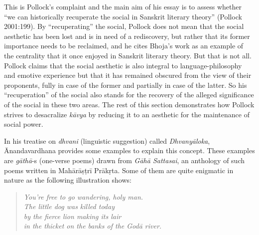 This is Pollock's complaint and the main aim of his essay is to assess whether ``we can historically recuperate the social in Sanskrit literary theory'' (Pollock 2001:199). By ``recuperating'' the social, Pollock does not mean that the social aesthetic has been lost and is in need of a rediscovery, but rather that its former importance needs to be reclaimed, and he cites Bhoja's work as an example of the centrality that it once enjoyed in Sanskrit literary theory. But that is not all. Pollock claims that the social aesthetic is also integral to language-philosophy and emotive experience but that it has remained obscured from the view of their proponents, fully in case of the former and partially in case of the latter. So his ``recuperation'' of the social also stands for the recovery of the alleged significance of the social in these two areas. The rest of this section demonstrates how Pollock strives to desacralize \textsl{kāvya} by reducing it to an aesthetic for the maintenance of social power.

In his treatise on \textsl{dhvani} (linguistic suggestion) called \textsl{Dhvanyāloka}, Ānandavardhana provides some examples to explain this concept. These examples are \textsl{gāthā}-s (one-verse poems) drawn from \textsl{Gāhā Sattasai}, an anthology of such poems written in Mahārāṣṭrī Prākṛta. Some of them are quite enigmatic in nature as the following illustration shows:\\[-15pt]
\begin{quote}
\textsl{You’re free to go wandering, holy man.}\\
\textsl{The little dog was killed today}\\
\textsl{by the fierce lion making its lair}\\
\textsl{in the thicket on the banks of the Godā river.}
\end{quote}
\vskip -5pt

